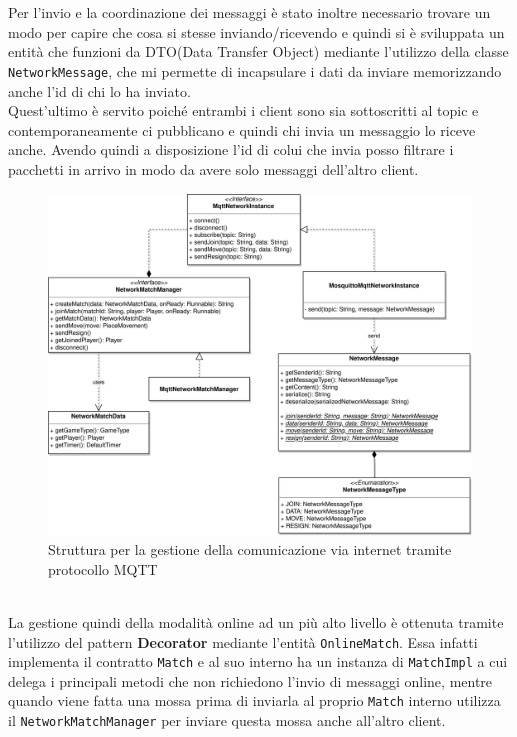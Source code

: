 \documentclass[a4paper,12pt]{report}
\begin{document}
\paragraph{}
\
\\
Per l'invio e la coordinazione dei messaggi è stato inoltre necessario trovare un modo per capire che cosa si stesse inviando/ricevendo e quindi si è sviluppata un entità che funzioni da DTO(Data Transfer Object) mediante l'utilizzo della classe \texttt{NetworkMessage}, che mi permette di incapsulare i dati da inviare memorizzando anche l'id di chi lo ha inviato.
\\
Quest'ultimo è servito poiché entrambi i client sono sia sottoscritti al topic e contemporaneamente ci pubblicano e quindi chi invia un messaggio lo riceve anche.
Avendo quindi a disposizione l'id di colui che invia posso filtrare i pacchetti in arrivo in modo da avere solo messaggi dell'altro client.
\begin{figure}[H]
    \begin{center}
        \centering
        \includegraphics[width=\textwidth]{img/Alessandro/online.png}
    \end{center}
    \caption{Struttura per la gestione della comunicazione via internet tramite protocollo MQTT}
    \label{img:online}
\end{figure}
\
\\
La gestione quindi della modalità online ad un più alto livello è ottenuta tramite l'utilizzo del pattern \textbf{Decorator} mediante l'entità \texttt{OnlineMatch}.
Essa infatti implementa il contratto \texttt{Match} e al suo interno ha un instanza di \texttt{MatchImpl} a cui delega i principali metodi che non richiedono l'invio di messaggi online, mentre quando viene fatta una mossa prima di inviarla al proprio \texttt{Match} interno utilizza il \texttt{NetworkMatchManager} per inviare questa mossa anche all'altro client.
\end{document}
